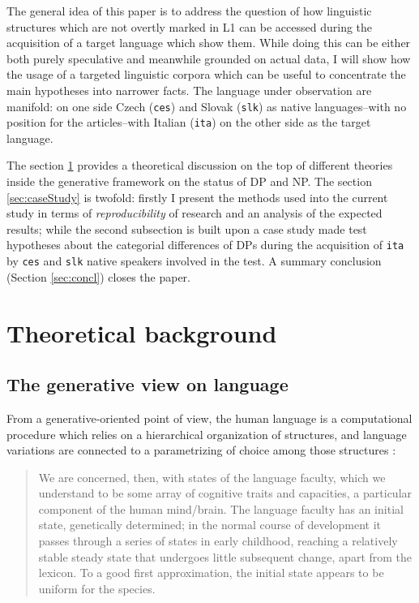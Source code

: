 \documentclass[
  a4paper,
  twoside,
  12pt,
  chapterprefix=false,
  listof=flat]{scrartcl}
\theoremstyle{plain} %
\theoremstyle{definition}
\theoremstyle{remark}
\begin{document}
The general idea of this paper is to address the question of how linguistic structures which are not overtly marked in L1 can be accessed during the acquisition of a target language which show them. While doing this can be either both purely speculative and meanwhile grounded on actual data, I will show how the usage of a targeted linguistic corpora which can be useful to concentrate the main hypotheses into narrower facts. The language under observation are manifold: on one side Czech (\texttt{ces}) and Slovak (\texttt{slk}) as native languages--with no position for the articles--with Italian (\texttt{ita}) on the other side as the target language.

The section \ref{sec:theoryBg} provides a theoretical discussion on the top of different theories inside the generative framework \citep{chomsky1995} on the status of DP and NP. The section \ref{sec:caseStudy} is twofold: firstly I present the methods used into the current study in terms of \emph{reproducibility} of research and an analysis of the expected results; while the second subsection is built upon a case study made test hypotheses about the categorial differences of DPs during the acquisition of \texttt{ita} by \texttt{ces} and \texttt{slk} native speakers involved in the test.
A summary conclusion (Section \ref{sec:concl}) closes the paper.

\hypertarget{sec:theoryBg}{%
\section{Theoretical background}\label{sec:theoryBg}}

\hypertarget{the-generative-view-on-language}{%
\subsection{The generative view on language}\label{the-generative-view-on-language}}

From a generative-oriented point of view, the human language is a computational procedure which relies on a hierarchical organization of structures, and language variations are connected to a parametrizing of choice among those structures \citep{adger2013, chomsky1995, chomsky1998, chomsky2013, chomsky2015, rizzi2013}:

\begin{quote}
We are concerned, then, with states of the language faculty, which we understand to be some array of cognitive traits and capacities, a particular component of the human mind/brain. The language faculty has an initial state, genetically determined; in the normal course of development it passes through a series of states in early childhood, reaching a relatively stable steady state that undergoes little subsequent change, apart from the lexicon. To a good first approximation, the initial state appears to be uniform for the species. \citep{chomsky1995}
\end{quote}
\end{document}
